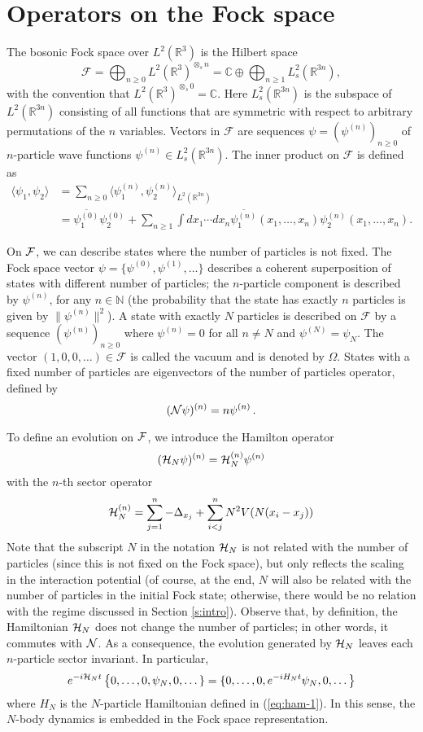 \documentclass[11pt,a4paper]{article}
\newcommand{\bN}{{\mathbb N}}
\newcommand{\cF}{{\cal F}}
\newcommand{\cH}{{\cal H}}
\newcommand{\cN}{{\cal N}}
\newcommand{\R}{\mathbb{R}}
\begin{document}
\section{Operators on the Fock space}
\label{sec:fock}

The bosonic Fock space over $L^2(\R^3)$ is the Hilbert space
\[
  \mathcal{F} = \bigoplus_{n \ge 0} L^2(\R^3)^{\otimes_s n} = \mathbb{C}
  \oplus \bigoplus_{n \ge 1} L^2_s(\R^{3n}),
\]
with the convention that $L^2(\R^3)^{\otimes_s 0} = \mathbb{C}$. Here
$L^2_s (\R^{3n})$ is the subspace of $L^2(\R^{3n})$ consisting of all functions
that are symmetric with respect to arbitrary permutations of the $n$
variables. Vectors in $\mathcal{F}$ are sequences $\psi = (\psi^{(n)})_{n
\ge 0}$ of $n$-particle wave functions $\psi^{(n)} \in L^2_s(\R^{3n})$. The
inner product on $\mathcal{F}$ is defined as
\begin{align*}
  \langle \psi_1, \psi_2 \rangle & = \sum_{n \ge 0} \langle \psi_1^{(n)},
  \psi_2^{(n)} \rangle_{L^2(\R^{3n})} \\
  & = \overline{\psi_1^{(0)}} \psi_2^{(0)} + \sum_{n \ge 1} \int dx_1 \cdots
  dx_n \overline{\psi_1^{(n)}}(x_1, \dots, x_n) \psi_2^{(n)}(x_1, \dots, x_n).
\end{align*}

On $\cF$, we can describe states where the number of particles is not fixed. The Fock space 
vector $\psi = \{ \psi^{(0)}, \psi^{(1)}, \dots  \}$ describes a coherent superposition 
of states with different number of particles; the $n$-particle component is described by $\psi^{(n)}$, for any $n \in \bN$ (the probability that the state has exactly $n$ particles is given by $\| \psi^{(n)} \|^2$).  
A state with exactly $N$ particles is described on
$\mathcal{F}$ by a sequence $(\psi^{(n)})_{n \ge 0}$ where $\psi^{(n)} =
0$ for all $n \neq N$ and $\psi^{(N)} = \psi_N$. The vector $(1, 0, 0, \dots
) \in \mathcal{F}$ is called the vacuum and is denoted by $\Omega$.
States with a fixed number of particles are eigenvectors of the number of particles operator, defined by
\[ (\cN \psi)^{(n)} = n \psi^{(n)} \, . \]

To define an evolution on $\cF$, we introduce the Hamilton operator 
\[ (\cH_N \psi)^{(n)} = \cH_N^{(n)} \psi^{(n)} \]
with the $n$-th sector operator 
\[ \cH_N^{(n)} = \sum_{j=1}^n -\Delta_{x_j} + \sum_{i<j}^n N^2 V(N (x_i - x_j)) \]
Note that the subscript $N$ in the notation $\cH_N$ is not related with the number of particles (since this is not fixed on the Fock space), but only reflects the scaling in the interaction potential (of course, at the end, $N$ will also be related with the number of particles in the initial Fock state; otherwise, there would be no relation with the regime discussed in Section \ref{s:intro}). Observe that, by definition, the Hamiltonian $\cH_N$ does not change the number of particles; in other words, it commutes with $\cN$. As a consequence, the evolution generated by $\cH_N$ leaves each $n$-particle sector invariant. In particular, 
\[ e^{-i\cH_N t}  \left\{ 0, \dots , 0, \psi_N , 0 ,\dots \} = \{ 0, \dots, 0, e^{-iH_N t} \psi_N , 0 ,\dots \right\} \]
where $H_N$ is the $N$-particle Hamiltonian defined in (\ref{eq:ham-1}). In this sense, the $N$-body dynamics is embedded in the Fock space representation. 
\end{document}
